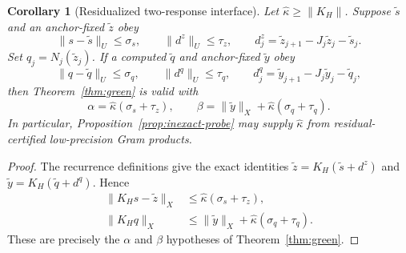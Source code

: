 \documentclass{article}
\newtheorem{corollary}{Corollary}
\begin{document}
\begin{corollary}[Residualized two-response interface]
\label{cor:two-response-residual}
Let $\widehat\kappa\ge\|K_H\|$.  Suppose $\widetilde s$ and an anchor-fixed
$\widetilde z$ obey
\begin{equation}
 \|s-\widetilde s\|_U\le\sigma_s,\qquad
 \|d^z\|_U\le\tau_z,\qquad
 d^z_j=\widetilde z_{j+1}-J_j\widetilde z_j-\widetilde s_j.
\end{equation}
Set $q_j=N_j(\widetilde z_j)$.  If a computed $\widetilde q$ and anchor-fixed
$\widetilde y$ obey
\begin{equation}
 \|q-\widetilde q\|_U\le\sigma_q,\qquad
 \|d^q\|_U\le\tau_q,\qquad
 d^q_j=\widetilde y_{j+1}-J_j\widetilde y_j-\widetilde q_j,
\end{equation}
then Theorem~\ref{thm:green} is valid with
\begin{equation}
 \alpha=\widehat\kappa(\sigma_s+\tau_z),\qquad
 \beta=\|\widetilde y\|_X+\widehat\kappa(\sigma_q+\tau_q).
 \label{eq:two-response-residual}
\end{equation}
In particular, Proposition~\ref{prop:inexact-probe} may supply
$\widehat\kappa$ from residual-certified low-precision Gram products.
\end{corollary}

\begin{proof}
The recurrence definitions give the exact identities
$\widetilde z=K_H(\widetilde s+d^z)$ and
$\widetilde y=K_H(\widetilde q+d^q)$.  Hence
\begin{align}
 \|K_Hs-\widetilde z\|_X
 &\le\widehat\kappa(\sigma_s+\tau_z),\\
 \|K_Hq\|_X
 &\le\|\widetilde y\|_X+\widehat\kappa(\sigma_q+\tau_q).
\end{align}
These are precisely the $\alpha$ and $\beta$ hypotheses of
Theorem~\ref{thm:green}.
\end{proof}
\end{document}
